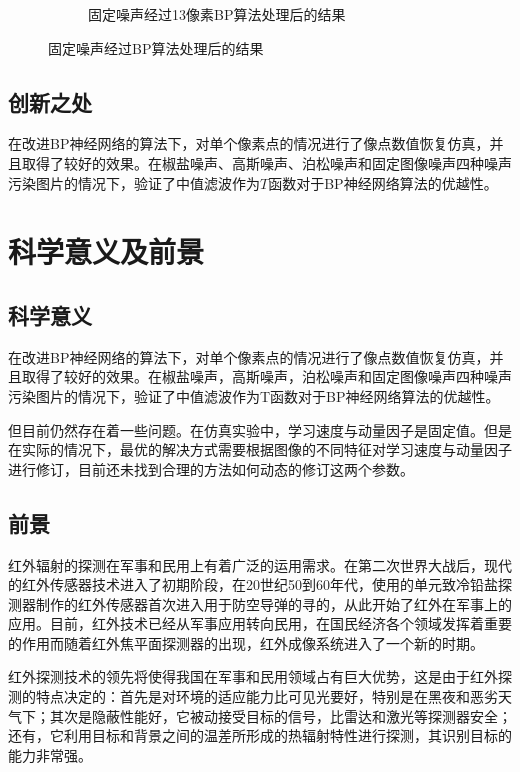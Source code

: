 \documentclass{article}
\newcounter{sub}
\begin{document}
\begin{figure}[htpb]
\begin{subfigure}[htpb]{.45\linewidth}
		\caption{固定噪声经过13像素BP算法处理后的结果}
		\label{fig:固定噪声经过13像素BP算法处理后的结果}
	\end{subfigure}
	\caption{固定噪声经过BP算法处理后的结果}
	\label{fig:固定噪声经过BP算法处理后的结果}
\end{figure}

\subsection{创新之处}%
\label{sub:创新之处}

在改进BP神经网络的算法下，对单个像素点的情况进行了像点数值恢复仿真，并且取得了较好的效果。在椒盐噪声、高斯噪声、泊松噪声和固定图像噪声四种噪声污染图片的情况下，验证了中值滤波作为$ T $函数对于BP神经网络算法的优越性。

\newpage

\section{科学意义及前景}%
\label{sec:科学意义及前景}

\subsection{科学意义}%
\label{sub:科学意义}

在改进BP神经网络的算法下，对单个像素点的情况进行了像点数值恢复仿真，并且取得了较好的效果。在椒盐噪声，高斯噪声，泊松噪声和固定图像噪声四种噪声污染图片的情况下，验证了中值滤波作为T函数对于BP神经网络算法的优越性。

但目前仍然存在着一些问题。在仿真实验中，学习速度与动量因子是固定值。但是在实际的情况下，最优的解决方式需要根据图像的不同特征对学习速度与动量因子进行修订，目前还未找到合理的方法如何动态的修订这两个参数。

\subsection{前景}%
\label{sub:前景}

红外辐射的探测在军事和民用上有着广泛的运用需求。在第二次世界大战后，现代的红外传感器技术进入了初期阶段，在20世纪50到60年代，使用的单元致冷铅盐探测器制作的红外传感器首次进入用于防空导弹的寻的，从此开始了红外在军事上的应用。目前，红外技术已经从军事应用转向民用，在国民经济各个领域发挥着重要的作用而随着红外焦平面探测器的出现，红外成像系统进入了一个新的时期。

红外探测技术的领先将使得我国在军事和民用领域占有巨大优势，这是由于红外探测的特点决定的：首先是对环境的适应能力比可见光要好，特别是在黑夜和恶劣天气下；其次是隐蔽性能好，它被动接受目标的信号，比雷达和激光等探测器安全；还有，它利用目标和背景之间的温差所形成的热辐射特性进行探测，其识别目标的能力非常强。
\end{document}
